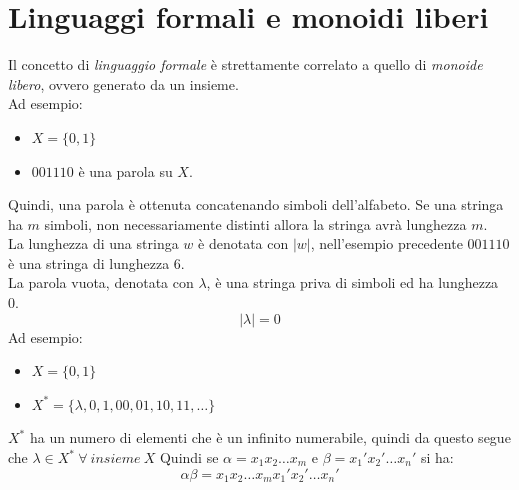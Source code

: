 \documentclass[12pt]{report}
\begin{document}
	\section{Linguaggi formali e monoidi liberi}
	Il concetto di \textit{linguaggio formale} è strettamente correlato a quello di \textit{monoide libero}, ovvero generato da un insieme. \\
	{
	}
	{
	}
	Ad esempio:
	\begin{itemize}
		\item $X = \{0, 1\}$
		\item $001110$ è una parola su $X$.
	\end{itemize}
	Quindi, una parola è ottenuta concatenando simboli dell'alfabeto. Se una stringa ha $m$ simboli, non necessariamente distinti allora la stringa avrà lunghezza $m$. \\
	La lunghezza di una stringa $w$ è denotata con $|w|$, nell'esempio precedente $001110$ è una stringa di lunghezza 6. \\
	La parola vuota, denotata con $\lambda$, è una stringa priva di simboli ed ha lunghezza 0.
	\[
	|\lambda| = 0
	\]
	{
	}
	Ad esempio:
	\begin{itemize}
		\item $X = \{0, 1\}$
		\item $X^* = \{\lambda, 0, 1, 00, 01, 10, 11, \dots\}$
	\end{itemize}
	$X^*$ ha un numero di elementi che è un infinito numerabile, quindi da questo segue che $\lambda \in X^*\ \forall\ insieme\ X$
	{
	}
	Quindi se $\alpha = x_1x_2\dots x_m$ e $\beta = x_1'x_2'\dots x_n'$ si ha:
	\[
	\alpha\beta = x_1x_2\dots x_mx_1'x_2'\dots x_n'
	\]
\end{document}
